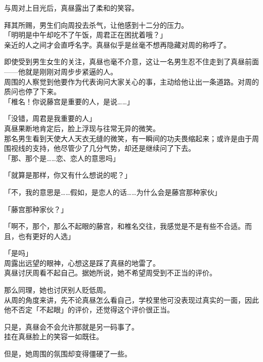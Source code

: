 与周对上目光后，真昼露出了柔和的笑容。

拜其所赐，男生们向周投去杀气，让他感到十二分的压力。\\

「明明是中午却吃不了午饭，周君正在困扰着哦？」\\

亲近的人之间才会直呼名字。真昼似乎是丝毫不想再隐藏对周的称呼了。

即使受到男生女生的关注，真昼也毫不介意，这让一名男生忍不住走到了真昼前面——他就是刚刚对周步步紧逼的人。\\

周围的人察觉到他要作为代表询问大家关心的事，主动给他让出一条道路。对周的质问也停了下来。\\

「椎名！你说藤宫是重要的人，是说……」

「没错，周君是我重要的人」\\

真昼果断地肯定后，脸上浮现与往常无异的微笑。\\

那名男生看到天使大人天衣无缝的微笑，有一瞬间的功夫畏缩起来；或许是由于周围视线的支持，他尽管少了几分气势，却还是继续问了下去。\\

「那、那个是……恋、恋人的意思吗」

「就算是那样，你又有什么想说的呢？」

「不，我的意思是……假如，是恋人的话……为什么会是藤宫那种家伙」

「藤宫那种家伙？」

「啊不，那个，那么不起眼的藤宫，和椎名交往，我感觉是不是有些不合适。而且，也有更好的人选」

「是吗」\\

周露出远望的眼神，心想这是踩了真昼的地雷了。\\

真昼讨厌周看不起自己。据她所说，她不希望周受到不正当的评价。

那么同理，她也讨厌别人贬低周。\\

从周的角度来讲，先不论真昼怎么看自己，学校里他可没表现过真实的一面，因此他不否定「不起眼」的评价，还觉得这个评价很正当。

只是，真昼会不会允许那就是另一码事了。\\

挂在真昼脸上的笑容一如既往。

但是，她周围的氛围却变得僵硬了一些。\\

